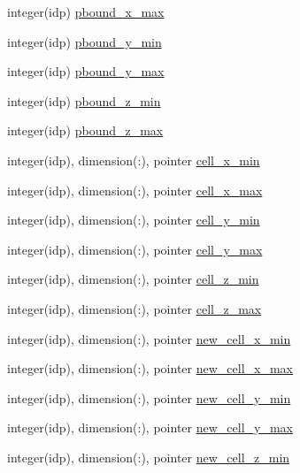 \begin{DoxyCompactItemize}
\item 
integer(idp) \hyperlink{namespaceshared__data_adbc28423ed7ee8d94f8bfca74bd32e6b}{pbound\+\_\+x\+\_\+max}
\item 
integer(idp) \hyperlink{namespaceshared__data_a670a14ad33bf9e1411faa45e7e645601}{pbound\+\_\+y\+\_\+min}
\item 
integer(idp) \hyperlink{namespaceshared__data_a789fc5dd4f217b459a18ee3164db5b49}{pbound\+\_\+y\+\_\+max}
\item 
integer(idp) \hyperlink{namespaceshared__data_a4a1369d7b48f6af28c6ca1dc0ce994bd}{pbound\+\_\+z\+\_\+min}
\item 
integer(idp) \hyperlink{namespaceshared__data_a5e441f4d6639c5549649b3afb6656029}{pbound\+\_\+z\+\_\+max}
\item 
integer(idp), dimension(\+:), pointer \hyperlink{namespaceshared__data_a2bcdae01850fe7a172972cd09651522b}{cell\+\_\+x\+\_\+min}
\item 
integer(idp), dimension(\+:), pointer \hyperlink{namespaceshared__data_a560a198cff32066380eaf1263719724d}{cell\+\_\+x\+\_\+max}
\item 
integer(idp), dimension(\+:), pointer \hyperlink{namespaceshared__data_ae56bf14b4506902ecafbf55e116d20ce}{cell\+\_\+y\+\_\+min}
\item 
integer(idp), dimension(\+:), pointer \hyperlink{namespaceshared__data_af3b3d41c5b4d46127faa634d5ad58df2}{cell\+\_\+y\+\_\+max}
\item 
integer(idp), dimension(\+:), pointer \hyperlink{namespaceshared__data_afecb94589cd67cd5d41a3fedbda6f373}{cell\+\_\+z\+\_\+min}
\item 
integer(idp), dimension(\+:), pointer \hyperlink{namespaceshared__data_a77325d94a7eab8f2fd6f3ff431d9a2a3}{cell\+\_\+z\+\_\+max}
\item 
integer(idp), dimension(\+:), pointer \hyperlink{namespaceshared__data_a10145b0bb8ee0c72e82290f916cf2196}{new\+\_\+cell\+\_\+x\+\_\+min}
\item 
integer(idp), dimension(\+:), pointer \hyperlink{namespaceshared__data_a82693bb4d22e778bf04d48d96c91a066}{new\+\_\+cell\+\_\+x\+\_\+max}
\item 
integer(idp), dimension(\+:), pointer \hyperlink{namespaceshared__data_a84817c7eb5400fa54c3a9899bd34b1ed}{new\+\_\+cell\+\_\+y\+\_\+min}
\item 
integer(idp), dimension(\+:), pointer \hyperlink{namespaceshared__data_a29f3a632264095aa2e7d7e5050269d17}{new\+\_\+cell\+\_\+y\+\_\+max}
\item 
integer(idp), dimension(\+:), pointer \hyperlink{namespaceshared__data_aa191272df3d1d06fda40ef3f38987f4d}{new\+\_\+cell\+\_\+z\+\_\+min}

\end{DoxyCompactItemize}
